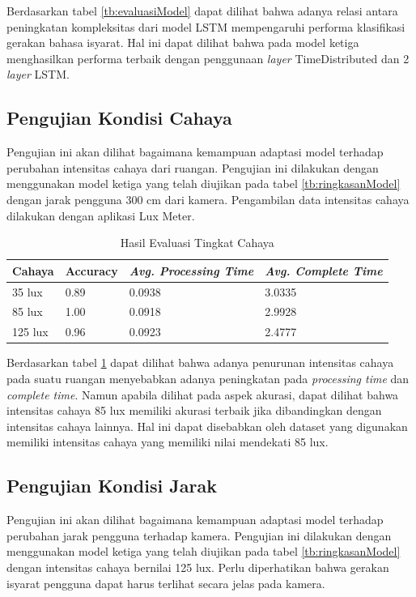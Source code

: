 Berdasarkan tabel \ref{tb:evaluasiModel} dapat dilihat bahwa adanya relasi antara peningkatan kompleksitas dari model LSTM mempengaruhi performa klasifikasi gerakan bahasa isyarat. Hal ini dapat dilihat bahwa pada model ketiga menghasilkan performa terbaik dengan penggunaan \emph{layer} TimeDistributed dan 2 \emph{layer} LSTM.

\subsection{Pengujian Kondisi Cahaya}
\label{sec:analisiscahaya}

Pengujian ini akan dilihat bagaimana kemampuan adaptasi model terhadap perubahan intensitas cahaya dari ruangan. Pengujian ini dilakukan dengan menggunakan model ketiga yang telah diujikan pada tabel \ref{tb:ringkasanModel} dengan jarak pengguna 300 cm dari kamera. Pengambilan data intensitas cahaya dilakukan dengan aplikasi Lux Meter.

\begin{table}[H]
  \caption{Hasil Evaluasi Tingkat Cahaya}
  \label{tb:evaluasiCahaya}
  \centering
  \begin{tabular}{llll}
    \hline
    \textbf{Cahaya} & \textbf{Accuracy} & \emph{\textbf{Avg. Processing Time}} & \emph{\textbf{Avg. Complete Time}} \\
    \hline
    35 lux & 0.89 & 0.0938 & 3.0335 \\
    85 lux & 1.00 & 0.0918 & 2.9928 \\
    125 lux & 0.96 & 0.0923 & 2.4777 \\
    \hline
  \end{tabular}
\end{table}

Berdasarkan tabel \ref{tb:evaluasiCahaya} dapat dilihat bahwa adanya penurunan intensitas cahaya pada suatu ruangan menyebabkan adanya peningkatan pada \emph{processing time} dan \emph{complete time}. Namun apabila dilihat pada aspek akurasi, dapat dilihat bahwa intensitas cahaya 85 lux memiliki akurasi terbaik jika dibandingkan dengan intensitas cahaya lainnya. Hal ini dapat disebabkan oleh dataset yang digunakan memiliki intensitas cahaya yang memiliki nilai mendekati 85 lux.


\subsection{Pengujian Kondisi Jarak}
\label{sec:analisisjarak}

Pengujian ini akan dilihat bagaimana kemampuan adaptasi model terhadap perubahan jarak pengguna terhadap kamera.  Pengujian ini dilakukan dengan menggunakan model ketiga yang telah diujikan pada tabel \ref{tb:ringkasanModel} dengan intensitas cahaya bernilai 125 lux. Perlu diperhatikan bahwa gerakan isyarat pengguna dapat harus terlihat secara jelas pada kamera. 

